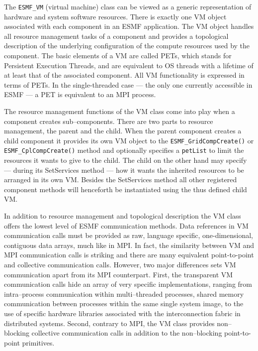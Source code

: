 
The {\tt ESMF\_VM} (virtual machine) class can be viewed as a generic representation of hardware and system software resources. There is exactly one VM object associated with each component in an ESMF application. The VM object handles all resource management tasks of a component and provides a topological description of the underlying configuration of the compute resources used by the component. The basic elements of a VM are called PETs, which stands for Persistent Execution Threads, and are equivalent to OS threads with a lifetime of at least that of the associated component. All VM functionality is expressed in terms of PETs. In the single-threaded case --- the only one currently accessible in ESMF --- a PET is equivalent to an MPI process. 

The resource management functions of the VM class come into play when a component creates sub--components. There are two parts to resource management, the parent and the child. When the parent component creates a child component it provides its own VM object to the {\tt ESMF\_GridCompCreate()} or {\tt ESMF\_CplCompCreate()} method and optionally specifies a {\tt petList} to limit the resources it wants to give to the child. The child on the other hand may specify --- during its SetServices method --- how it wants the inherited resources to be arranged in its own VM. Besides the SetServices method all other registered component methods will henceforth be instantiated using the thus defined child VM.

In addition to resource management and topological description the VM class offers the lowest level of ESMF communication methods. Data references in VM communication calls must be provided as raw, language specific, one-dimensional, contiguous data arrays, much like in MPI. In fact, the similarity between VM and MPI communication calls is striking and there are many equivalent point-to-point and collective communication calls. However, two major differences sets VM communication apart from its MPI counterpart. First, the transparent VM communication calls hide an array of very specific implementations, ranging from intra--process communication within multi--threaded processes, shared memory communication between processes within the same single system image, to the use of specific hardware libraries associated with the interconnection fabric in distributed systems. Second, contrary to MPI, the VM class provides non--blocking collective communication calls in addition to the non--blocking point-to-point primitives.
